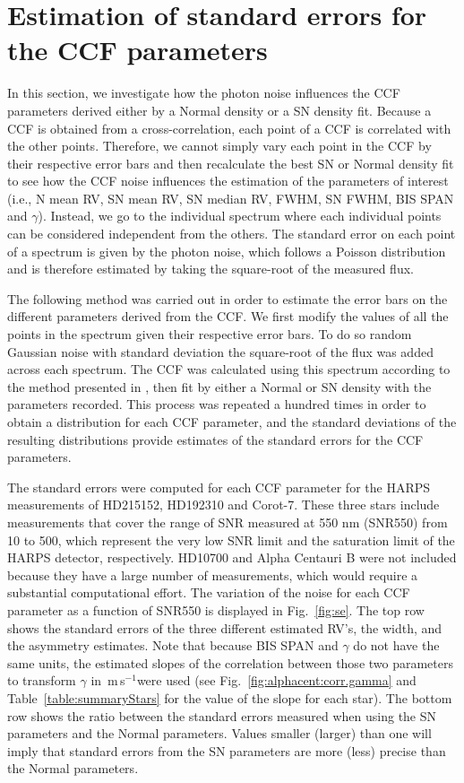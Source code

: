 \documentclass{aa}
\def\ms{\hbox{\,m\,s$^{-1}$}}         %
\begin{document}
\section{Estimation of standard errors for the CCF parameters} \label{sec:5}

In this section, we investigate how the photon noise influences the CCF parameters derived either by a Normal density or a SN density fit. 
Because a CCF is obtained from a cross-correlation, each point of a CCF is correlated with the other points. Therefore, we cannot simply vary each point in the CCF by their respective error bars and then recalculate the best SN or Normal density fit to see how the CCF noise influences the estimation of the parameters of interest (i.e., N mean RV, SN mean RV, SN median RV, FWHM, SN FWHM, BIS SPAN and $\gamma$). 
Instead, we go to the individual spectrum where each individual points can be considered independent from the others.
The standard error on each point of a spectrum is given by the photon noise, which follows a Poisson distribution and is therefore estimated by taking the square-root of the measured flux.

The following method was carried out in order to estimate the error bars on the different parameters derived from the CCF. 
We first modify the values of all the points in the spectrum given their respective error bars. 
To do so random Gaussian noise with standard deviation the square-root of the flux was added across each spectrum. 
The CCF was calculated using this spectrum according to the method presented in \citet{Pepe-2002a}, then fit by either a Normal or SN density with the parameters recorded. 
This process was repeated a hundred times in order to obtain a distribution for each CCF parameter, and the standard deviations of the resulting distributions provide estimates of the standard errors for the CCF parameters.

The standard errors were computed for each CCF parameter for the HARPS measurements of HD215152, HD192310 and Corot-7. 
These three stars include measurements that cover the range of SNR measured at 550 nm (SNR550) from 10 to 500, which represent the very low SNR limit and the saturation limit of the HARPS detector, respectively. 
HD10700 and Alpha Centauri B were not included because they have a large number of measurements, which would require a substantial computational effort.
The variation of the noise for each CCF parameter as a function of SNR550 is displayed in Fig.~\ref{fig:se}.
The top row shows the standard errors of the three different estimated RV's, the width, and the asymmetry estimates. 
Note that because BIS SPAN and $\gamma$ do not have the same units, the estimated slopes of the correlation between those two parameters to transform $\gamma$ in \ms were used (see Fig.~\ref{fig:alphacent:corr.gamma} and Table~\ref{table:summaryStars} for the value of the slope for each star). 
The bottom row shows the ratio between the standard errors measured when using the SN parameters and the Normal parameters. Values smaller (larger) than one will imply that standard errors from the SN parameters are more (less) precise than the Normal parameters.
\end{document}
